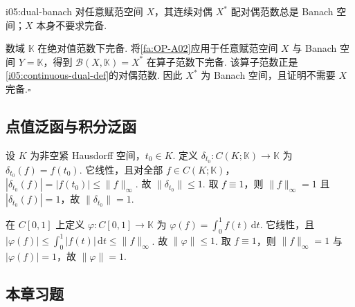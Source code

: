 \begin{FACorollary}[A][连续对偶总是Banach空间]{i05:dual-banach}
对任意赋范空间 \(\displaystyle X\)，其连续对偶 \(\displaystyle X^*\) 配对偶范数总是 Banach 空间；\(\displaystyle X\) 本身不要求完备.
\end{FACorollary}

\begin{FAProof}
数域 \(\displaystyle \mathbb K\) 在绝对值范数下完备. 将\autoref{fa:OP-A02}应用于任意赋范空间 \(\displaystyle X\) 与 Banach 空间 \(\displaystyle Y=\mathbb K\)，得到 \(\displaystyle \mathcal B(X,\mathbb K)=X^*\) 在算子范数下完备. 该算子范数正是\autoref{i05:continuous-dual-def}的对偶范数. 因此 \(\displaystyle X^*\) 为 Banach 空间，且证明不需要 \(\displaystyle X\) 完备.\hfill\(\square\)
\end{FAProof}

\subsection{点值泛函与积分泛函}

\begin{FAExample}[点值泛函]\label{i05:evaluation-functional}
设 \(\displaystyle K\) 为非空紧 Hausdorff 空间，\(\displaystyle t_0\in K\). 定义 \(\displaystyle \delta_{t_0}:C(K;\mathbb K)\to\mathbb K\) 为 \(\displaystyle \delta_{t_0}(f)=f(t_0)\).
它线性，且对全部 \(\displaystyle f\in C(K;\mathbb K)\)， \(\displaystyle |\delta_{t_0}(f)|=|f(t_0)|\leqslant\|f\|_\infty\).
故 \(\displaystyle \|\delta_{t_0}\|\leqslant1\). 取 \(\displaystyle f\equiv1\)，则 \(\displaystyle \|f\|_\infty=1\) 且 \(\displaystyle |\delta_{t_0}(f)|=1\)，故 \(\displaystyle \|\delta_{t_0}\|=1\).
\end{FAExample}

\begin{FAExample}[积分泛函]\label{i05:integral-functional}
在 \(\displaystyle C[0,1]\) 上定义 \(\displaystyle \varphi:C[0,1]\to\mathbb K\) 为 \(\displaystyle \varphi(f)=\int_0^1 f(t)\,\mathrm{d}t\).
它线性，且 \(\displaystyle |\varphi(f)| \leqslant\int_0^1|f(t)|\,\mathrm{d}t \leqslant\|f\|_\infty\).
故 \(\displaystyle \|\varphi\|\leqslant1\). 取 \(\displaystyle f\equiv1\)，则 \(\displaystyle \|f\|_\infty=1\) 与 \(\displaystyle |\varphi(f)|=1\)，故 \(\displaystyle \|\varphi\|=1\).
\end{FAExample}

\subsection{本章习题}\label{sec:i05-exercises}

